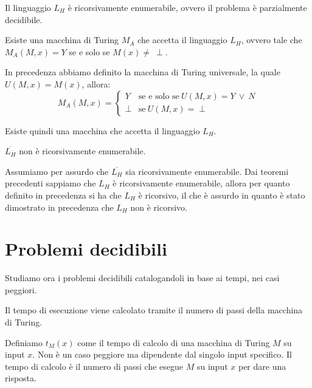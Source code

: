 \begin{teorema}
    Il linguaggio $L_H$ è ricorsivamente enumerabile, ovvero il problema è 
    parzialmente decidibile.
\end{teorema}
\begin{dimostrazione}
    Esiste una macchina di Turing $M_A$ che accetta il linguaggio $L_H$, ovvero 
    tale che $M_A(M, x) = Y$ se e solo se $M(x) \neq \ \perp$. 

    In precedenza abbiamo definito la macchina di Turing universale, la quale 
    $U(M, x) = M(x)$, allora:
    \begin{equation}
        M_A(M, x) = \begin{cases}
            Y & \text{se e solo se} \ U(M, x) = Y \ \lor \ N \\
            \perp & \text{se} \ U(M, x) = \perp
        \end{cases}
    \end{equation}

    Esiste quindi una macchina che accetta il linguaggio $L_H$.
\end{dimostrazione}
\begin{teorema}
    $\overline{L_H}$ non è ricorsivamente enumerabile.
\end{teorema}
\begin{dimostrazione} 
    Assumiamo per assurdo che $\overline{L_H}$ sia ricorsivamente enumerabile. 
    Dai teoremi precedenti sappiamo che $L_H$ è ricorsivamente enumerabile, allora 
    per quanto definito in precedenza si ha che $L_H$ è ricorsivo, il che è assurdo 
    in quanto è stato dimostrato in precedenza che $L_H$ non è ricorsivo.
\end{dimostrazione}
\section{Problemi decidibili}
Studiamo ora i problemi decidibili catalogandoli in base ai tempi, nei casi peggiori.

Il tempo di esecuzione viene calcolato tramite il numero di passi della macchina di Turing.
\begin{definizione}
     Definiamo $t_M(x)$ come il tempo di calcolo di una macchina di Turing $M$ su 
     input $x$. Non è un caso peggiore ma dipendente dal singolo input specifico.
      Il tempo di calcolo è il numero di passi che esegue $M$ su input $x$ per dare una risposta.
\end{definizione}

